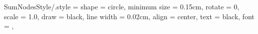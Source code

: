 
\tikzset
{
	SumNodesStyle/.style =
	{
		shape			= circle,				%
		minimum size	= 0.15cm,				%
		rotate			= 0,					%
		scale			= 1.0,					%
		draw			= black,				%
		line width		= 0.02cm,				%
		align			= center,				%
		text			= black,				%
		font			= \normalsize\normalfont,	%
	}
}

